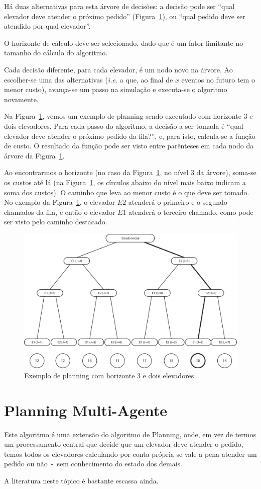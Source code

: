 Há duas alternativas para esta árvore de decisões: a decisão pode ser ``qual
elevador deve atender o próximo pedido'' (Figura~\ref{fig:planning}),
ou ``qual pedido deve ser atendido por qual elevador''. %

O horizonte de cálculo deve ser selecionado, dado que é um fator limitante no
tamanho do cálculo do algoritmo.

Cada decisão diferente, para cada elevador, é um nodo novo na árvore. Ao
escolher-se uma das alternativas (\textit{i.e.} a que, ao final de $x$ eventos
no futuro tem o menor custo), avança-se um passo na simulação e executa-se o
algoritmo novamente.

Na Figura~\ref{fig:planning}, vemos um exemplo de planning sendo executado com
horizonte 3 e dois elevadores. Para cada passo do algoritmo, a decisão a ser
tomada é ``qual elevador deve atender o próximo pedido da fila?'', e, para isto,
calcula-se a função de custo. O resultado da função pode ser visto entre
parênteses em cada nodo da árvore da Figura~\ref{fig:planning}.

Ao encontrarmos o horizonte (no caso da Figura~\ref{fig:planning}, no nível 3 da
árvore), soma-se os custos até lá (na Figura~\ref{fig:planning}, os círculos
abaixo do nível mais baixo indicam a soma dos custos). O caminho que leva ao
menor custo é o que deve ser tomado. No exemplo da Figura~\ref{fig:planning}, o
elevador $E2$ atenderá o primeiro e o segundo chamados da fila, e então o
elevador $E1$ atenderá o terceiro chamado, como pode ser visto pelo caminho destacado.

\begin{figure}[htb!]
  \centering
  \includegraphics[scale=0.6]{img/planning.eps}
  \caption{Exemplo de planning com horizonte 3 e dois elevadores}
\label{fig:planning}
\end{figure}

\section{Planning Multi-Agente}

Este algoritmo é uma extensão do algoritmo de Planning, onde, em vez de termos
um processamento central que decide que um elevador deve atender o pedido, temos
todos os elevadores calculando por conta própria se vale a pena atender um
pedido ou não~-~sem conhecimento do estado dos demais.

A literatura neste tópico é bastante escassa ainda.